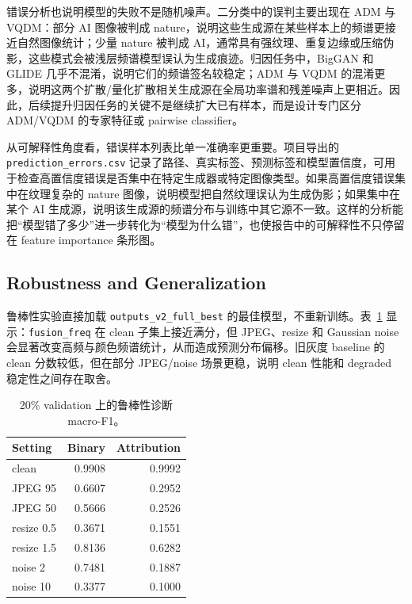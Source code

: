 \documentclass[sigconf,nonacm]{acmart}
\begin{document}
错误分析也说明模型的失败不是随机噪声。二分类中的误判主要出现在 ADM 与 VQDM：部分 AI 图像被判成 nature，说明这些生成源在某些样本上的频谱更接近自然图像统计；少量 nature 被判成 AI，通常具有强纹理、重复边缘或压缩伪影，这些模式会被浅层频谱模型误认为生成痕迹。归因任务中，BigGAN 和 GLIDE 几乎不混淆，说明它们的频谱签名较稳定；ADM 与 VQDM 的混淆更多，说明这两个扩散/量化扩散相关生成源在全局功率谱和残差噪声上更相近。因此，后续提升归因任务的关键不是继续扩大已有样本，而是设计专门区分 ADM/VQDM 的专家特征或 pairwise classifier。

从可解释性角度看，错误样本列表比单一准确率更重要。项目导出的 \texttt{prediction\_errors.csv} 记录了路径、真实标签、预测标签和模型置信度，可用于检查高置信度错误是否集中在特定生成器或特定图像类型。如果高置信度错误集中在纹理复杂的 nature 图像，说明模型把自然纹理误认为生成伪影；如果集中在某个 AI 生成源，说明该生成源的频谱分布与训练中其它源不一致。这样的分析能把“模型错了多少”进一步转化为“模型为什么错”，也使报告中的可解释性不只停留在 feature importance 条形图。

\subsection{Robustness and Generalization}
鲁棒性实验直接加载 \texttt{outputs\_v2\_full\_best} 的最佳模型，不重新训练。表~\ref{tab:robustness} 显示：\texttt{fusion\_freq} 在 clean 子集上接近满分，但 JPEG、resize 和 Gaussian noise 会显著改变高频与颜色频谱统计，从而造成预测分布偏移。旧灰度 baseline 的 clean 分数较低，但在部分 JPEG/noise 场景更稳，说明 clean 性能和 degraded 稳定性之间存在取舍。

\begin{table}[H]
  \centering
  \caption{20\% validation 上的鲁棒性诊断 macro-F1。}
  \label{tab:robustness}
  \begin{tabular}{lrr}
    \toprule
    Setting & Binary & Attribution \\
    \midrule
    clean & 0.9908 & 0.9992 \\
    JPEG 95 & 0.6607 & 0.2952 \\
    JPEG 50 & 0.5666 & 0.2526 \\
    resize 0.5 & 0.3671 & 0.1551 \\
    resize 1.5 & 0.8136 & 0.6282 \\
    noise 2 & 0.7481 & 0.1887 \\
    noise 10 & 0.3377 & 0.1000 \\
    \bottomrule
  \end{tabular}
\end{table}
\end{document}
